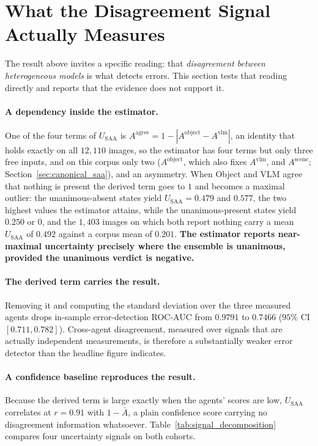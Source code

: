 \documentclass[12pt,a4paper]{report}
\begin{document}
\section{What the Disagreement Signal Actually Measures}
\label{sec:signal_decomposition}
The result above invites a specific reading: that \emph{disagreement between heterogeneous models} is what detects errors. This section tests that reading directly and reports that the evidence does not support it.

\paragraph{A dependency inside the estimator.} One of the four terms of $U_{\text{SAA}}$ is $A^{\text{agree}} = 1 - |A^{\text{object}} - A^{\text{vlm}}|$, an identity that holds exactly on all $12{,}110$ images, so the estimator has four terms but only three free inputs, and on this corpus only two ($A^{\text{object}}$, which also fixes $A^{\text{vlm}}$, and $A^{\text{scene}}$; Section~\ref{sec:canonical_saa}), and an asymmetry. When Object and VLM agree that nothing is present the derived term goes to $1$ and becomes a maximal outlier: the unanimous-absent states yield $U_{\text{SAA}}=0.479$ and $0.577$, the two highest values the estimator attains, while the unanimous-present states yield $0.250$ or $0$, and the $1{,}403$ images on which both report nothing carry a mean $U_{\text{SAA}}$ of $0.492$ against a corpus mean of $0.201$. \textbf{The estimator reports near-maximal uncertainty precisely where the ensemble is unanimous, provided the unanimous verdict is negative.}

\paragraph{The derived term carries the result.} Removing it and computing the standard deviation over the three measured agents drops in-sample error-detection ROC-AUC from $\mathbf{0.9791}$ to $\mathbf{0.7466}$ ($95\%$ CI $[0.711, 0.782]$). Cross-agent disagreement, measured over signals that are actually independent measurements, is therefore a substantially weaker error detector than the headline figure indicates.

\paragraph{A confidence baseline reproduces the result.} Because the derived term is large exactly when the agents' scores are low, $U_{\text{SAA}}$ correlates at $r=0.91$ with $1-\bar{A}$, a plain confidence score carrying no disagreement information whatsoever. Table~\ref{tab:signal_decomposition} compares four uncertainty signals on both cohorts.
\end{document}
